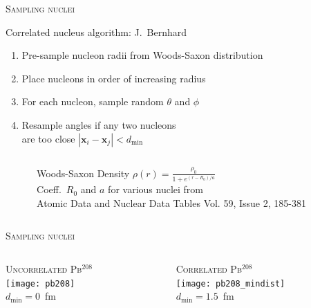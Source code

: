 \documentclass{beamer}
\newcommand{\lead}[1]{
  \node (position) at (8.8 cm, -5 cm) {\texttt{[image: \#1]}};
}
\begin{document}
\begin{frame}[t]{\scshape Sampling nuclei}

  {\color{theme} Correlated nucleus algorithm: J.\ Bernhard} \\
  \begin{enumerate}
    \small
    \item Pre-sample nucleon radii from Woods-Saxon distribution
    \item Place nucleons in order of increasing radius
    \item For each nucleon, sample random $\theta$ and $\phi$ \\
    \item Resample angles if any two nucleons \\
          are too close $|\mathbf{x}_i - \mathbf{x}_j| < d_\mathrm{min}$
  \end{enumerate}

  \begin{columns}
    \begin{column}{.05\textwidth}
    \end{column}
    \begin{column}{.45\textwidth}
      \medskip
      \begin{block}{\centering\small Woods-Saxon Density}
        \medskip
        \centering\small $\displaystyle \rho(r) = \frac{\rho_0}{1 + e^{(r - R_0)/a}}$ \\[2ex]
        \scriptsize Coeff.\ $R_0$ and $a$ for various nuclei from \\
        \textcolor{theme}{Atomic Data and Nuclear Data Tables Vol. 59, Issue 2, 185-381} 
        \smallskip
      \end{block}
    \end{column}
    \begin{column}{.5\textwidth}
    \end{column}
  \end{columns}
\end{frame}

\begin{frame}{\scshape Sampling nuclei}
  \begin{columns}
    \begin{column}{.5\textwidth}
      \centering
      {\scshape Uncorrelated Pb$^{208}$} \\
      \texttt{[image: pb208]} \\
      $d_\mathrm{min}=0$~fm
    \end{column}
    \vline
    \begin{column}{.5\textwidth}
      \centering
      {\scshape Correlated Pb$^{208}$} \\
      \texttt{[image: pb208\_mindist]} \\
      $d_\mathrm{min}=1.5$~fm
    \end{column}
  \end{columns}
\end{frame}
\end{document}
